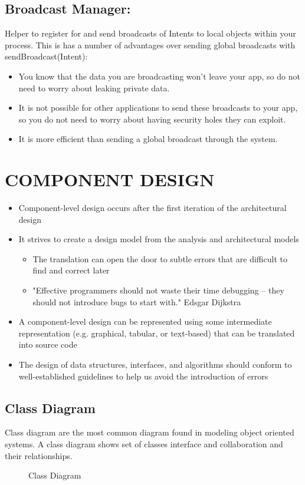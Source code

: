 \documentclass[12pt,a4paper]{report}
\begin{document}
\subsection{Broadcast Manager:}	
Helper to register for and send broadcasts of Intents to local objects within your process. This is has a number of advantages over sending global broadcasts with sendBroadcast(Intent): 
\begin{itemize}
	\item	You know that the data you are broadcasting won't leave your app, so do not need to worry about leaking private data. 
	\item	It is not possible for other applications to send these broadcasts to your app, so you do not need to worry about having security holes they can exploit. 
	\item	It is more efficient than sending a global broadcast through the system. 
\end{itemize}

\section{COMPONENT DESIGN}
\begin{itemize}
\item Component-level design occurs after the first iteration of the architectural design
\item It strives to create a design model from the analysis and architectural models
\begin{itemize}
\item The translation can open the door to subtle errors that are difficult to find and correct later
\item "Effective programmers should not waste their time debugging – they should not introduce bugs to start with."  Edsgar Dijkstra
\end{itemize}
\item A component-level design can be represented using some intermediate representation (e.g. graphical, tabular, or text-based) that can be translated into source code
\item The design of data structures, interfaces, and algorithms should conform to well-established guidelines to help us avoid the introduction of errors
\end{itemize}

\subsection{Class Diagram}
Class diagram are the most common diagram found in modeling object oriented systems. A class diagram shows set of classes interface and collaboration and their relationships.
\begin{figure}[h]
	\begin{center}
		\caption{Class Diagram}
	\end{center}
\end{figure}
\end{document}
